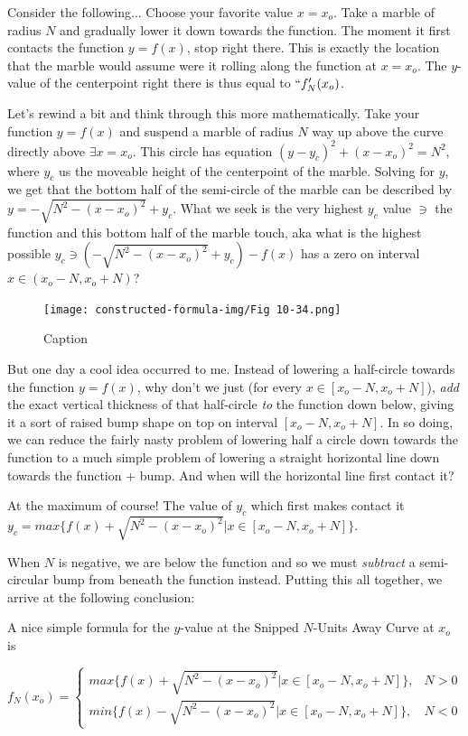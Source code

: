 Consider the following... Choose your favorite value $x = x_o$. Take a marble of radius $N$ and gradually lower it down towards the function. The moment it first contacts the function $y = f(x)$, stop right there. This is exactly the location that the marble would assume were it rolling along the function at $x = x_o$. The $y$-value of the centerpoint right there is thus equal to $``f_N'(x_o)$.

Let's rewind a bit and think through this more mathematically. Take your function $y = f(x)$ and suspend a marble of radius $N$ way up above the curve directly above $\exists x = x_o$. This circle has equation $(y - y_c)^2 + (x - x_o)^2 = N^2$, where $y_c$ us the moveable height of the centerpoint of the marble. Solving for $y$, we get that the bottom half of the semi-circle of the marble can be described by $y = - \sqrt{N^2 -(x - x_o)^2} + y_c$. What we seek is the very highest $y_c$ value $\ni$ the function and this bottom half of the marble touch, aka what is the highest possible $y_c \ni (- \sqrt{N^2 - (x - x_o)^2} + y_c) - f(x)$ has a zero on interval $x \in (x_o - N, x_o + N)$?

\begin{figure}
  \texttt{[image: constructed-formula-img/Fig 10-34.png]}
  \caption{Caption}
  \label{fig:fig10-34}
\end{figure}

But one day a cool idea occurred to me. Instead of lowering a half-circle towards the function $y = f(x)$, why don't we just (for every $x \in [x_o - N, x_o + N]$), \textit{add} the exact vertical thickness of that half-circle \textit{to} the function down below, giving it a sort of raised bump shape on top on interval $[x_o - N, x_o + N]$. In so doing, we can reduce the fairly nasty problem of lowering half a circle down towards the function to a much simple problem of lowering a straight horizontal line down towards the function + bump. And when will the horizontal line first contact it?

At the maximum of course! The value of $y_c$ which first makes contact it $y_c = max \{ f(x) + \sqrt{N^2 - (x - x_o)^2} | x \in [ x_o - N, x_o + N] \}$.

When $N$ is negative, we are below the function and so we must \textit{subtract} a semi-circular bump from beneath the function instead. Putting this all together, we arrive at the following conclusion:

\begin{myTrm} A nice simple formula for the $y$-value at the Snipped $N$-Units Away Curve at $x_o$ is

$$
f_N(x_o) = \begin{cases}
 max \{ f(x) + \sqrt{N^2 - (x - x_o)^2} | x \in [ x_o - N, x_o + N] \}, & N > 0 \\
 min \{ f(x) - \sqrt{N^2 - (x - x_o)^2} | x \in [ x_o - N, x_o + N] \}, & N < 0
\end{cases}
$$

\end{myTrm}


